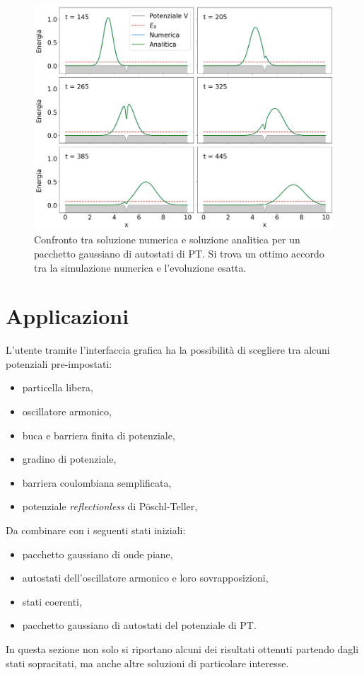 \documentclass[12pt]{report}
\begin{document}
\begin{figure}
    \centering
    \includegraphics[width = \textwidth]{immagini/WP_RL.png}
    \caption{ \textcolor{dark-gray}{Confronto tra soluzione numerica e soluzione analitica per un pacchetto gaussiano di autostati di PT. Si trova un ottimo accordo tra la simulazione numerica e l'evoluzione esatta.}}
    \label{fig:WP_RL}
\end{figure}

\chapter{Applicazioni}
\label{ch:applicazioni}

L'utente tramite l'interfaccia grafica ha la possibilità di scegliere tra alcuni potenziali pre-impostati:
\begin{itemize}[nolistsep]
    \item particella libera,
    \item oscillatore armonico,
    \item buca e barriera finita di potenziale,
    \item gradino di potenziale,
    \item barriera coulombiana semplificata,
    \item potenziale \textsl{reflectionless} di P\"oschl-Teller,
\end{itemize}
Da combinare con i seguenti stati iniziali:
\begin{itemize}[nolistsep]
    \item pacchetto gaussiano di onde piane, 
    \item autostati dell'oscillatore armonico e loro sovrapposizioni,
    \item stati coerenti,
    \item pacchetto gaussiano di autostati del potenziale di PT.
\end{itemize}
In questa sezione non solo si riportano alcuni dei risultati ottenuti partendo dagli stati sopracitati, ma anche altre soluzioni di particolare interesse.
\end{document}
